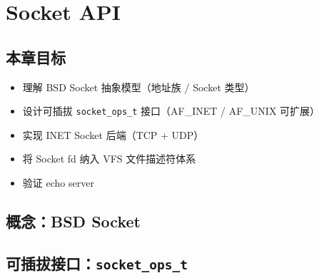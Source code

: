\chapter{Socket API}
\label{ch:socket}

\section{本章目标}

\begin{itemize}
  \item 理解 BSD Socket 抽象模型（地址族 / Socket 类型）
  \item 设计可插拔 \texttt{socket\_ops\_t} 接口（AF\_INET / AF\_UNIX 可扩展）
  \item 实现 INET Socket 后端（TCP + UDP）
  \item 将 Socket fd 纳入 VFS 文件描述符体系
  \item 验证 echo server
\end{itemize}

\section{概念：BSD Socket}
\label{sec:socket-concept}


\section{可插拔接口：\texttt{socket\_ops\_t}}
\label{sec:socket-interface}

